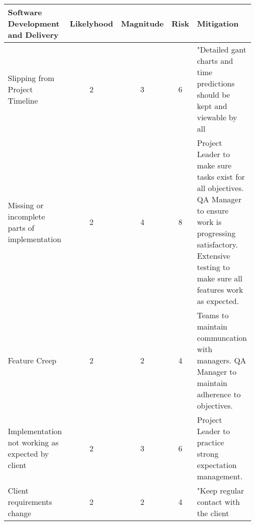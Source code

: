 \documentclass{article}
\begin{document}
\begin{tabular}[]{| p{3cm} | c | c | c | p{5cm} |}
\hline
\textbf{Software Development and Delivery}&\textbf{Likelyhood}&\textbf{Magnitude}&\textbf{Risk}&\textbf{Mitigation} \\ \hline \hline
Slipping from Project Timeline&2&3&6&"Detailed gant charts and time predictions should be kept and viewable by all\\ \hline
Missing or incomplete parts of implementation&2&4&8&Project Leader to make sure tasks exist for all objectives. QA Manager to ensure work is progressing satisfactory. Extensive testing to make sure all features work as expected. \\ \hline
Feature Creep&2&2&4&Teams to maintain communcation with managers. QA Manager to maintain adherence to objectives. \\ \hline
Implementation not working as expected by client&2&3&6&Project Leader to practice strong expectation management. \\ \hline
Client requirements change&2&2&4&"Keep regular contact with the client\\ \hline

\end{tabular}
\end{document}
